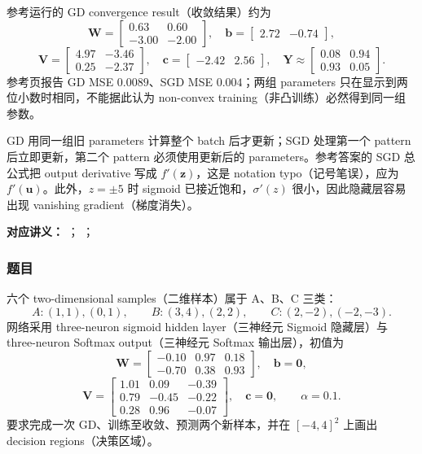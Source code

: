 \begin{checkedsolution}
参考运行的 GD convergence result（收敛结果）约为
\[
  \bm W=\begin{bmatrix}0.63&0.60\\-3.00&-2.00\end{bmatrix},\quad
  \bm b=\begin{bmatrix}2.72&-0.74\end{bmatrix},
\]
\[
  \bm V=\begin{bmatrix}4.97&-3.46\\0.25&-2.37\end{bmatrix},\quad
  \bm c=\begin{bmatrix}-2.42&2.56\end{bmatrix},\quad
  \bm Y\approx\begin{bmatrix}0.08&0.94\\0.93&0.05\end{bmatrix}.
\]
参考页报告 GD MSE $0.0089$、SGD MSE $0.004$；两组 parameters 只在显示到两位小数时相同，不能据此认为 non-convex training（非凸训练）必然得到同一组参数。

GD 用同一组旧 parameters 计算整个 batch 后才更新；SGD 处理第一个 pattern 后立即更新，第二个 pattern 必须使用更新后的 parameters。参考答案的 SGD 总公式把 output derivative 写成 $f'(\bm z)$，这是 notation typo（记号笔误），应为 $f'(\bm u)$。此外，$z=\pm5$ 时 sigmoid 已接近饱和，$\sigma'(z)$ 很小，因此隐藏层容易出现 vanishing gradient（梯度消失）。
\end{checkedsolution}


\textbf{对应讲义：}
；
；

\subsubsection*{题目}

六个 two-dimensional samples（二维样本）属于 A、B、C 三类：
\[
  A:(1,1),(0,1),\qquad
  B:(3,4),(2,2),\qquad
  C:(2,-2),(-2,-3).
\]
网络采用 three-neuron sigmoid hidden layer（三神经元 Sigmoid 隐藏层）与 three-neuron Softmax output（三神经元 Softmax 输出层），初值为
\[
  \bm W=\begin{bmatrix}-0.10&0.97&0.18\\-0.70&0.38&0.93\end{bmatrix},\quad
  \bm b=\bm0,
\]
\[
  \bm V=\begin{bmatrix}
    1.01&0.09&-0.39\\0.79&-0.45&-0.22\\0.28&0.96&-0.07
  \end{bmatrix},\quad \bm c=\bm0,\qquad \alpha=0.1.
\]
要求完成一次 GD、训练至收敛、预测两个新样本，并在 $[-4,4]^2$ 上画出 decision regions（决策区域）。

